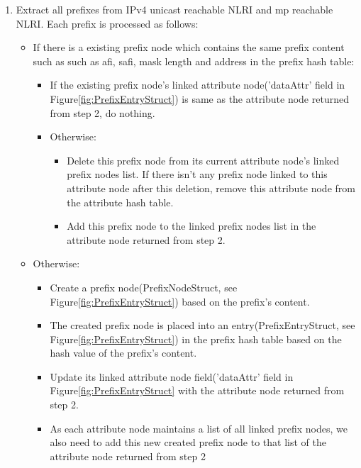 \begin{enumerate}
	\item{Extract all prefixes from IPv4 unicast reachable NLRI and mp reachable NLRI. Each prefix is processed as follows: }
	\begin{itemize}
		\item{If there is a existing prefix node which contains the same prefix content such as such as afi, safi, mask length and address in the prefix hash table:}
		\begin{itemize}
			\item{If the existing prefix node's linked attribute node('dataAttr' field in Figure\ref{fig:PrefixEntryStruct}) is same as the attribute node returned from step 2, do nothing.}			\item{Otherwise:}
			\begin{itemize}
				\item{Delete this prefix node from its current attribute node's linked prefix nodes list. If there isn't any prefix node linked to this attribute node after this deletion, remove this attribute node from the attribute hash table.}
			\item{Add this prefix node to the linked prefix nodes list in the attribute node returned from step 2.}
			\end{itemize} 	
		\end{itemize}
		\item{Otherwise:}
		\begin{itemize}
			\item{Create a prefix node(PrefixNodeStruct, see Figure\ref{fig:PrefixEntryStruct}) based on the prefix's content.}
			\item{The created prefix node is placed into an entry(PrefixEntryStruct, see Figure\ref{fig:PrefixEntryStruct}) in the prefix hash table based on the hash value of the prefix's content.} 			\item{Update its linked attribute node field('dataAttr' field in Figure\ref{fig:PrefixEntryStruct} with the attribute node returned from step 2. }
			\item{As each attribute node maintains a list of all linked prefix nodes, we also need to add this new created prefix node to that list of the attribute node returned from step 2}
		\end{itemize}
	\end{itemize}
	

\end{enumerate}

